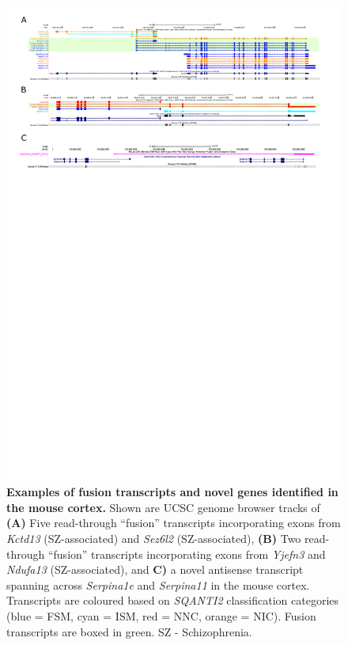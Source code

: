 \begin{landscape}
	\begin{figure}[htp]
		\begin{center}
			\includegraphics[page=1,trim={0 20cm 0 0},scale = 1.2]{Figures/FusionNovelGenes.pdf}
		\end{center}
		\vspace{1cm}
		\captionsetup{width=1.5\textwidth}
		\caption[Examples of fusion transcripts and novel genes identified in the mouse cortex]%
		{\textbf{Examples of fusion transcripts and novel genes identified in the mouse cortex.} Shown are UCSC genome browser tracks of \textbf{(A)} Five read-through “fusion” transcripts incorporating exons from \textit{Kctd13} (SZ-associated) and \textit{Sez6l2} (SZ-associated), \textbf{(B)} Two read-through “fusion” transcripts incorporating exons from \textit{Yjefn3} and \textit{Ndufa13} (SZ-associated), and \textbf{C)} a novel antisense transcript spanning across \textit{Serpina1e} and \textit{Serpina11} in the mouse cortex. Transcripts are coloured based on \textit{SQANTI2} classification categories (blue = FSM, cyan = ISM, red = NNC, orange = NIC). Fusion transcripts are boxed in green. SZ - Schizophrenia.}   
		\label{fig:isoseq_whole_novelfusion}
	\end{figure}
\end{landscape}


